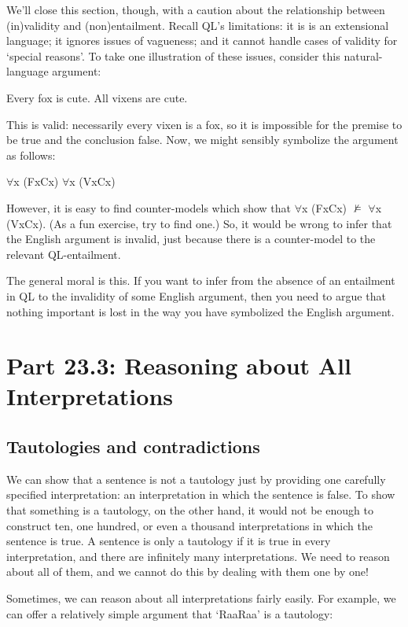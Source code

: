 We’ll close this section, though, with a caution about the relationship between (in)validity and (non)entailment. Recall QL’s limitations: it is is an extensional language; it ignores issues of vagueness; and it cannot handle cases of validity for ‘special reasons’. To take one illustration of these issues, consider this natural-language argument:
\begin{center}
Every fox is cute. \therefore All vixens are cute.
\end{center}
This is valid: necessarily every vixen is a fox, so it is impossible for the premise to be true and the conclusion false. Now, we might sensibly symbolize the argument as follows:
\begin{center}
$\forall$x (Fx\eif Cx) \therefore $\forall$x (Vx\eif Cx)
\end{center}
However, it is easy to find counter-models which show that $\forall$x (Fx\eif Cx) $\nvDash$ $\forall$x (Vx\eif Cx). (As a fun exercise, try to find one.) So, it would be wrong to infer that the English argument is invalid, just because there is a counter-model to the relevant QL-entailment.

The general moral is this. If you want to infer from the absence of an entailment in QL to the invalidity of some English argument, then you need to argue that nothing important is lost in the way you have symbolized the English argument.
\section{Part 23.3: Reasoning about All Interpretations}
\label{allinterp}
\subsection{Tautologies and contradictions}

We can show that a sentence is not a tautology just by providing one carefully specified interpretation: an interpretation in which the sentence is false. To show that something is a tautology, on the other hand, it would not be enough to construct ten, one hundred, or even a thousand interpretations in which the sentence is true. A sentence is only a tautology if it is true in every interpretation, and there are infinitely many interpretations. We need to reason about all of them, and we cannot do this by dealing with them one by one!

Sometimes, we can reason about all interpretations fairly easily. For example, we can offer a relatively simple argument that ‘Raa\eor \enot Raa’ is a tautology:

